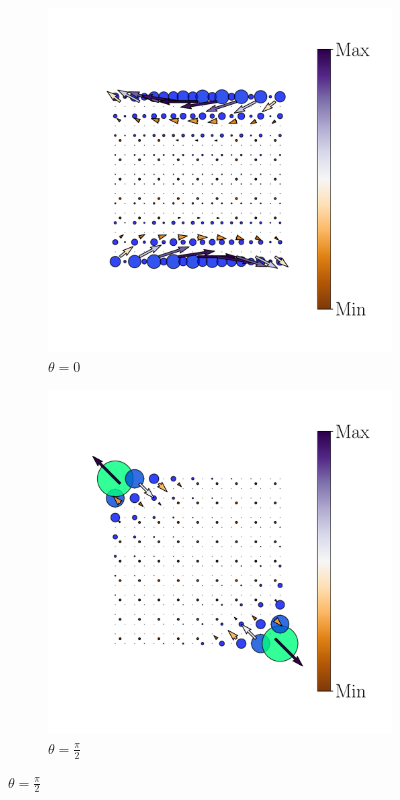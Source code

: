 \begin{figure}[h!]
\begin{minipage}[h!]{1.1\textwidth}
\begin{subfigure}[b!]{0.2 \textwidth}
         \end{subfigure}\hspace*{-0.5em}
          \begin{subfigure}[b!]{0.2 \textwidth}
             \caption*{$\theta = 0$}
             \includegraphics[width=\textwidth]{Imagenes/Resultados_pump_Cuadrado/x/hoti_pomp_x_neg3.pdf}
         \end{subfigure}\hspace*{-0.5em}
          \begin{subfigure}[b!]{0.2 \textwidth}
             \caption*{$\theta = \frac{\pi}{2}$}
             \includegraphics[width=\textwidth]{Imagenes/Resultados_pump_Cuadrado/x/hoti_pomp_x_neg4.pdf}

\end{subfigure}
\end{minipage}
\end{figure}
